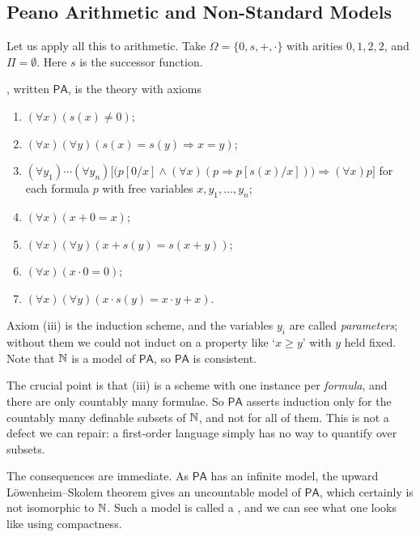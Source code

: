 \documentclass[a4paper]{scrartcl}
\newcommand{\PA}{\mathsf{PA}}
\begin{document}
\subsection{Peano Arithmetic and Non-Standard Models}

Let us apply all this to arithmetic. Take $\Omega = \{0, s, +, \cdot\}$ with arities $0, 1, 2, 2$, and $\Pi = \emptyset$. Here $s$ is the successor function.

\begin{definition}
  , written $\PA$, is the theory with axioms
  \begin{enumerate}[label=(\roman*)]
    \item $(\forall x)(s(x) \neq 0)$;
    \item $(\forall x)(\forall y)(s(x) = s(y) \Rightarrow x = y)$;
    \item $(\forall y_1)\cdots(\forall y_n)\bigl[\bigl(p[0/x] \land (\forall x)(p \Rightarrow p[s(x)/x])\bigr) \Rightarrow (\forall x)p\bigr]$ for each formula $p$ with free variables $x, y_1, \dots, y_n$;
    \item $(\forall x)(x + 0 = x)$;
    \item $(\forall x)(\forall y)(x + s(y) = s(x + y))$;
    \item $(\forall x)(x \cdot 0 = 0)$;
    \item $(\forall x)(\forall y)(x \cdot s(y) = x \cdot y + x)$.
  \end{enumerate}
\end{definition}

Axiom (iii) is the induction scheme, and the variables $y_i$ are called \emph{parameters}; without them we could not induct on a property like `$x \geq y$' with $y$ held fixed. Note that $\mathbb{N}$ is a model of $\PA$, so $\PA$ is consistent.

The crucial point is that (iii) is a scheme with one instance per \emph{formula}, and there are only countably many formulae. So $\PA$ asserts induction only for the countably many definable subsets of $\mathbb{N}$, and not for all of them. This is not a defect we can repair: a first-order language simply has no way to quantify over subsets.

The consequences are immediate. As $\PA$ has an infinite model, the upward L\"owenheim--Skolem theorem gives an uncountable model of $\PA$, which certainly is not isomorphic to $\mathbb{N}$. Such a model is called a , and we can see what one looks like using compactness.
\end{document}
